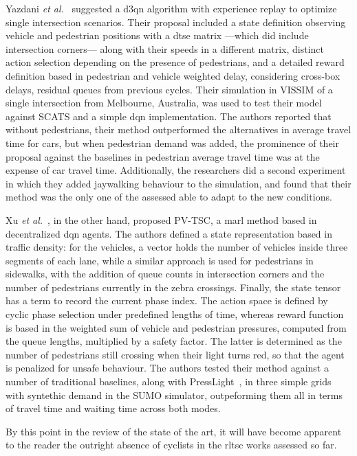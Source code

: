 Yazdani \textit{et al.}~\cite{Yazdani2023} suggested a \gls{d3qn} algorithm with experience replay to optimize single intersection scenarios. Their proposal included a state definition observing vehicle and pedestrian positions with a \gls{dtse} matrix —which did include intersection corners— along with their speeds in a different matrix, distinct action selection depending on the presence of pedestrians, and a detailed reward definition based in pedestrian and vehicle weighted delay, considering cross-box delays, residual queues from previous cycles. Their simulation in VISSIM of a single intersection from Melbourne, Australia, was used to test their model against SCATS and a simple \gls{dqn} implementation. The authors reported that without pedestrians, their method outperformed the alternatives in average travel time for cars, but when pedestrian demand was added, the prominence of their proposal against the baselines in pedestrian average travel time was at the expense of car travel time. Additionally, the researchers did a second experiment in which they added jaywalking behaviour to the simulation, and found that their method was the only one of the assessed able to adapt to the new conditions.

Xu \textit{et al.}~\cite{Xu2023}, in the other hand, proposed PV-TSC, a \gls{marl} method based in decentralized \gls{dqn} agents. The authors defined a state representation based in traffic density: for the vehicles, a vector holds the number of vehicles inside three segments of each lane, while a similar approach is used for pedestrians in sidewalks, with the addition of queue counts in intersection corners and the number of pedestrians currently in the zebra crossings. Finally, the state tensor has a term to record the current phase index. The action space is defined by cyclic phase selection under predefined lengths of time, whereas reward function is based in the weighted sum of vehicle and pedestrian pressures, computed from the queue lengths, multiplied by a safety factor. The latter is determined as the number of pedestrians still crossing when their light turns red, so that the agent is penalized for unsafe behaviour. The authors tested their method against a number of traditional baselines, along with PressLight~\cite{Wei2019b}, in three simple grids with syntethic demand in the SUMO simulator, outpeforming them all in terms of travel time and waiting time across both modes.

\medskip

\noindent By this point in the review of the state of the art, it will have become apparent to the reader the outright absence of cyclists in the \gls{rltsc} works assessed so far. 

